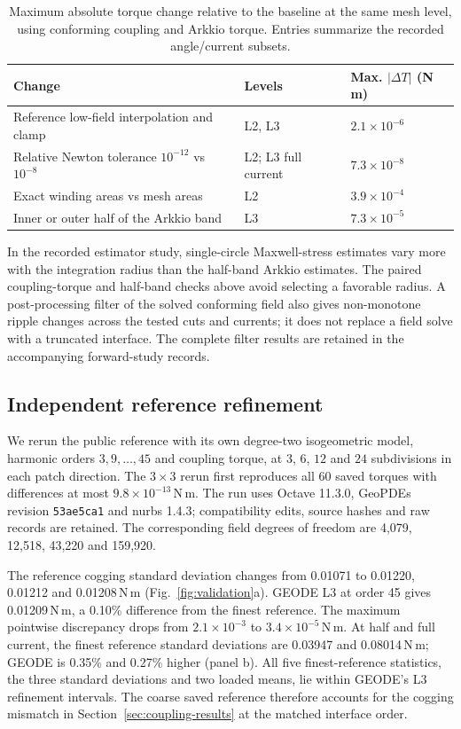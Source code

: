 \documentclass{anvil-paper}
\begin{document}
\begin{table}[htbp]\centering\small
\caption{Maximum absolute torque change relative to the baseline at the
same mesh level, using conforming coupling and Arkkio torque. Entries
summarize the recorded angle/current subsets.}
\label{tab:sensitivity}
\begin{tabular}{p{.48\linewidth}ll}\toprule
Change & Levels & Max. $|\Delta T|$ (N\,m)\\\midrule
Reference low-field interpolation and clamp & L2, L3 & $2.1\times10^{-6}$\\
Relative Newton tolerance $10^{-12}$ vs $10^{-8}$ & L2; L3 full current & $7.3\times10^{-8}$\\
Exact winding areas vs mesh areas & L2 & $3.9\times10^{-4}$\\
Inner or outer half of the Arkkio band & L3 & $7.3\times10^{-5}$\\
\bottomrule\end{tabular}
\end{table}

In the recorded estimator study, single-circle Maxwell-stress estimates
vary more with the integration radius than the half-band Arkkio estimates.
The paired coupling-torque and half-band checks above avoid selecting a
favorable radius. A post-processing filter of the solved conforming field
also gives non-monotone ripple changes across the tested cuts and currents;
it does not replace a field solve with a truncated interface. The complete
filter results are retained in the accompanying forward-study records.

\subsection{Independent reference refinement}\label{sec:refinement}
We rerun the public reference with its own degree-two isogeometric model,
harmonic orders $3,9,\ldots,45$ and coupling torque, at $3$, $6$, $12$ and
$24$ subdivisions in each patch direction. The $3\times3$ rerun first
reproduces all 60 saved torques with differences at most $9.8\times10^{-13}$\,N\,m.
The run uses Octave 11.3.0, GeoPDEs revision \texttt{53ae5ca1} and nurbs
1.4.3; compatibility edits, source hashes and raw records are retained.
The corresponding field degrees of freedom are 4,079, 12,518, 43,220
and 159,920.

The reference cogging standard deviation changes from 0.01071 to 0.01220,
0.01212 and 0.01208\,N\,m (Fig.~\ref{fig:validation}a). GEODE L3 at order
45 gives 0.01209\,N\,m, a 0.10\% difference from the finest reference.
The maximum pointwise discrepancy drops from $2.1\times10^{-3}$ to
$3.4\times10^{-5}$\,N\,m. At half and full current, the finest reference
standard deviations are 0.03947 and 0.08014\,N\,m; GEODE is 0.35\% and
0.27\% higher (panel b). All five finest-reference statistics, the three
standard deviations and two loaded means, lie within GEODE's L3
refinement intervals. The coarse saved reference therefore accounts for
the cogging mismatch in Section~\ref{sec:coupling-results} at the matched interface order.
\end{document}
